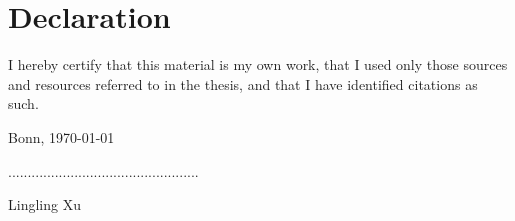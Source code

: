 \chapter*{Declaration}
\noindent I hereby certify that this material is my own work, that I used only those sources and resources referred to in the thesis, and that I have identified citations as such.

\vspace{0.3in}

\noindent Bonn, \today

\vspace{1in}
\noindent .................................................

\noindent Lingling Xu